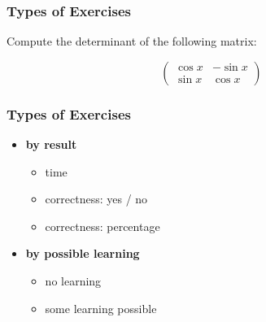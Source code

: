 \documentclass[xcolor=svgnames]{beamer}
\begin{document}
\begin{frame}
	\frametitle{Types of Exercises}
	Compute the determinant of the following matrix:
	\begin{center}
	\Huge
$$
\begin{pmatrix}
	\cos x & - \sin x \\
	\sin x & \cos x
\end{pmatrix}
$$
	\end{center}
\end{frame}
\begin{frame}
	\frametitle{Types of Exercises}

	\begin{itemize}
		\item 	\textbf{by result}
			\begin{itemize}
				\item time
				\item correctness: yes / no
				\item correctness: percentage
			\end{itemize}
		\item 	\textbf{by possible learning}
			\begin{itemize}
				\item no learning
				\item some learning possible
			\end{itemize}
	\end{itemize}
\end{frame}
\end{document}
